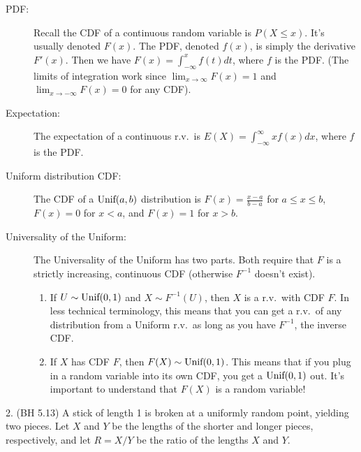 \documentclass{article}
\begin{document}
\begin{description}

\item[PDF: ]

Recall the CDF of a continuous random variable is $P(X \leq x)$. It's usually denoted $F(x)$. The PDF, denoted $f(x)$, is simply the derivative $F'(x)$. Then we have $F(x) = \int_{-\infty}^x f(t)dt$, where $f$ is the PDF. (The limits of integration work since $\lim_{x \rightarrow \infty} F(x) = 1$ and $\lim_{x \rightarrow -\infty} F(x) = 0$ for any CDF).

\item[Expectation: ]

The expectation of a continuous r.v.~is $E(X) = \int_{-\infty}^\infty xf(x)dx$, where $f$ is the PDF.

\item[Uniform distribution CDF: ]

The CDF of a $\textrm{Unif}(a, b)$ distribution is $F(x) = \frac{x - a}{b - a}$ for $a \leq x \leq b$, $F(x) = 0$ for $x < a$, and $F(x) = 1$ for $x > b$.

\item[Universality of the Uniform: ]

The Universality of the Uniform has two parts. Both require that $F$ is a strictly increasing, continuous CDF (otherwise $F^{-1}$ doesn't exist).
\begin{enumerate}
    \item If $U \sim \textrm{Unif}(0, 1)$ and $X \sim F^{-1}(U)$, then $X$ is a r.v.~with CDF $F$. In less technical terminology, this means that you can get a r.v.~of any distribution from a Uniform r.v.~as long as you have $F^{-1}$, the inverse CDF.
    
    \item If $X$ has CDF $F$, then $F(X) \sim \textrm{Unif}(0, 1)$. This means that if you plug in a random variable into its own CDF, you get a $\textrm{Unif}(0, 1)$ out. It's important to understand that $F(X)$ is a random variable!
\end{enumerate}

\end{description}

2. (BH 5.13) A stick of length 1 is broken at a uniformly random point, yielding two pieces. Let $X$ and $Y$ be the lengths of the shorter and longer pieces, respectively, and let $R = X/Y$ be the ratio of the lengths $X$ and $Y$.
\end{document}
